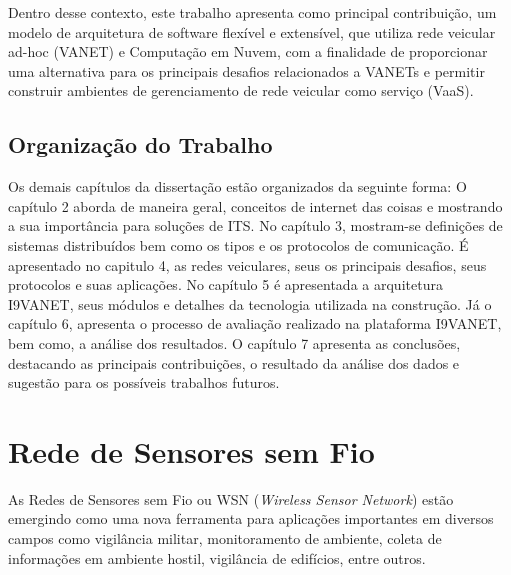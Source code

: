 \documentclass[
	12pt,				%
	oneside,			%
	a4paper,			%
	english,			%
	brazil				%
	]{abntex2ppgsi}
\begin{document}
Dentro desse contexto, este trabalho apresenta como principal contribuição, um modelo de arquitetura de software flexível e extensível, que utiliza rede veicular ad-hoc (VANET) e  Computação em Nuvem, com a finalidade de proporcionar uma alternativa para os principais desafios relacionados a VANETs e permitir construir ambientes de gerenciamento de rede veicular como serviço (VaaS).


\section{Organização do Trabalho}
Os demais capítulos da dissertação estão organizados da seguinte forma:
O capítulo 2 aborda de maneira geral, conceitos de internet das coisas e mostrando a sua importância para soluções de ITS. No capítulo 3, mostram-se definições de sistemas distribuídos bem como os tipos e os protocolos de comunicação. É apresentado no capitulo 4, as redes veiculares, seus os principais desafios, seus protocolos  e suas aplicações. No capítulo 5 é apresentada a arquitetura I9VANET, seus módulos e detalhes da tecnologia utilizada na construção. Já o capítulo 6, apresenta o processo de avaliação realizado na plataforma I9VANET, bem como, a análise dos resultados. O capítulo 7 apresenta as conclusões, destacando as principais contribuições, o resultado da análise dos dados e sugestão para os possíveis trabalhos futuros.


\chapter{Rede de Sensores sem Fio}

As Redes de Sensores sem Fio ou WSN (\textit{Wireless Sensor Network}) estão emergindo como uma nova ferramenta para aplicações importantes em diversos campos como vigilância militar, monitoramento de ambiente,  coleta de informações em ambiente hostil, vigilância de edifícios, entre outros. 
\end{document}

